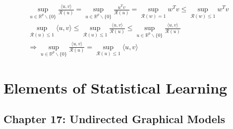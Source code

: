 \documentclass[11pt]{article}
\begin{document}
\begin{gather*}
    \sup_{u \in \mathbb{R}^p\backslash\{0\} } \frac{\langle u, v \rangle}{\mathcal{R}(u)} 
    =
    \sup_{u \in \mathbb{R}^p\backslash\{0\} } \frac{u^Tv}{\mathcal{R}(u)}
    =
    \sup_{\mathcal{R}(w)=1} w^{T}v
    \leq 
    \sup_{\mathcal{R}(w)\leq1} w^{T}v
%
	\\
 	\sup_{\mathcal{R}(u)\leq 1} \langle u,v \rangle 
	\leq 
	\sup_{\mathcal{R}(u)\leq 1}\frac{\langle u,v \rangle}{\mathcal{R}(u)}
	\leq 
	\sup_{u \in \mathbb{R}^p\backslash\{0\} } \frac{\langle u, v \rangle}{\mathcal{R}(u)}
\\
    \Rightarrow \sup_{u \in \mathbb{R}^p\backslash\{0\} } \frac{\langle u, v \rangle}{\mathcal{R}(u)} = \sup_{\mathcal{R}(u)\leq 1} \langle u,v \rangle
\end{gather*}



\newpage
\begin{tcolorbox}
\vspace{4mm}
\bf \LARGE \chapter{Elements of Statistical Learning}
\vspace{4mm}
\end{tcolorbox}

\section*{Chapter 17: Undirected Graphical Models}

\end{document}
